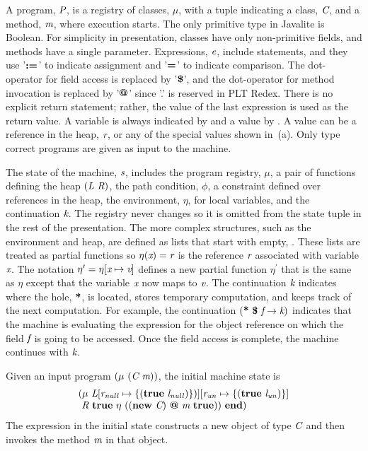 A program, $\emph{P}$, is a registry of classes, $\mu$, with
a tuple indicating a class, $\emph{C}$, and a method, $\emph{m}$,
where execution starts. The only primitive type in Javalite is
Boolean. For simplicity in presentation, classes have only
non-primitive fields, and methods have a single
parameter. Expressions, $\emph{e}$, include statements, and they use
'$\textbf{:=}$' to indicate assignment and '$\textbf{=}$' to indicate
comparison.  The dot-operator for field access is replaced by
'$\textbf{\$}$', and the dot-operator for method invocation is replaced
by '$\textbf{@}$' since '.' is reserved in PLT Redex. There is no
explicit return statement; rather, the value of the last expression is
used as the return value. A variable is always indicated by 
and a value by . A value can be a reference in the heap,
$\emph{r}$, or any of the special values shown
in~(a).  Only type correct programs are given as
input to the machine.

The state of the machine, $\emph{s}$, includes the program
registry, $\mu$, a pair of functions defining the heap
$(\emph{L}\ \emph{R})$, the path condition, $\phi$, a constraint defined over
references in the heap, the environment, $\eta$, for local variables,
and the continuation $\emph{k}$. The registry never changes so it is
omitted from the state tuple in the rest of the presentation.  The
more complex structures, such as the environment and heap, are defined
as lists that start with empty, . These lists are treated as
partial functions so $\eta(\emph{x}) = \emph{r}$ is the reference
$\emph{r}$ associated with variable $\emph{x}$. The notation
$\eta^\prime = \eta[\emph{x} \mapsto \emph{v}]$ defines a new
partial function $\eta^\prime$ that is the same as $\eta$ except that
the variable $\emph{x}$ now maps to $\emph{v}$. The continuation
$\emph{k}$ indicates where the hole, $\textbf{*}$, is located, stores
temporary computation, and keeps track of the next computation. For
example, the continuation $\lp\cfgt{*}\ \cfgt{\$}\ \cfgnt{f}
\rightarrow \cfgnt{k}\rp$ indicates that the machine is evaluating the
expression for the object reference on which the field $\emph{f}$ is
going to be accessed. Once the field access is complete, the machine
continues with $\emph{k}$.


Given an input program $\lp\mu\ \lp\cfgnt{C}\ \cfgnt{m}\rp\rp$, the initial machine state is
$$
\begin{array}{l}
\lp\mu 
\ \cfgnt{L}[\cfgnt{r}_\mathit{null} \mapsto \{\lp\cfgt{true}\ \cfgnt{l}_\mathit{null})\}\rp] 
           [\cfgnt{r}_\mathit{un} \mapsto \{\lp\cfgt{true}\ \cfgnt{l}_\mathit{un}\rp\}] \\
\ \cfgnt{R}
\ \cfgt{true}\ \eta\  \lp\lp\cfgt{new}\ \cfgnt{C}\rp\ \cfgt{@}\ \cfgnt{m}\ \cfgt{true}\rp\rp\ \cfgt{end}\rp
\end{array}
$$
The expression in the initial state constructs a new object of type
$\emph{C}$ and then invokes the method $\emph{m}$ in that
object. 

